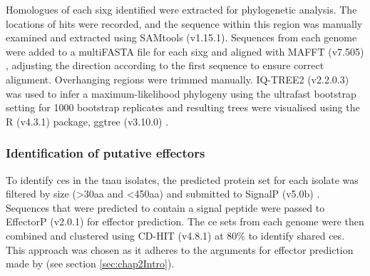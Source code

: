 Homologues of each \ac{sixg} identified were extracted for phylogenetic analysis.  The locations of hits were recorded, and the sequence within this region was manually examined and extracted using SAMtools (v1.15.1). Sequences from each genome were added to a multiFASTA file for each \ac{sixg} and aligned with MAFFT (v7.505) \parencite{Katoh2019}, adjusting the direction according to the first sequence to ensure correct alignment. Overhanging regions were trimmed manually. IQ-TREE2 (v2.2.0.3) \parencite{Nguyen2015} was used to infer a maximum-likelihood phylogeny using the ultrafast bootstrap setting for 1000 bootstrap replicates and resulting trees were visualised using the R (v4.3.1) \parencite{R} package, ggtree (v3.10.0) \parencite{ggtree}.
\subsubsection{Identification of putative effectors}

To identify \acfp{ce} in the \ac{tnau} isolates, the predicted protein set for each isolate was filtered by size (>30aa and <450aa) and submitted to SignalP (v5.0b) \parencite{Petersen2011}. Sequences that were predicted to contain a signal peptide were passed to EffectorP (v2.0.1) \parencite{Sperschneider2018} for effector prediction. The \ac{ce} sets from each genome were then combined and clustered using CD-HIT (v4.8.1) \parencite{Fu2012} at 80\% to identify shared \acp{ce}. This approach was chosen as it adheres to the arguments for effector prediction made by \textcite{Sperschneider2015, Todd2022} (see section \ref{sec:chap2Intro}). 



